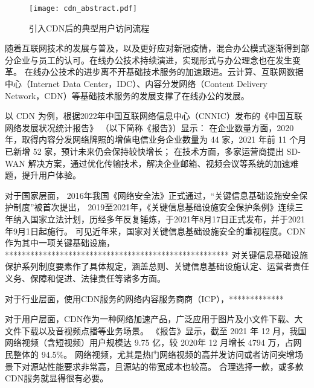 \begin{figure}[h]
	\centering
	\texttt{[image: cdn\_abstract.pdf]}
	\caption{引入CDN后的典型用户访问流程}
	\label{fig:join_cdn_classic}
\end{figure}





随着互联网技术的发展与普及，以及更好应对新冠疫情，混合办公模式逐渐得到部分企业与员工的认可。在线办公技术持续演进，实现形式与办公理念也在发生变革。
在线办公技术的进步离不开基础技术服务的加速跟进。云计算、互联网数据中心（Internet Data Center，IDC）、内容分发网络（Content Delivery Network，CDN）等基础技术服务的发展支撑了在线办公的发展。

以 CDN 为例，根据2022年中国互联网络信息中心（CNNIC）发布的《中国互联网络发展状况统计报告》\cite{cnnic2022} （以下简称《报告》）显示：
在企业数量方面，2020 年，取得内容分发网络牌照的增值电信业务企业数量为 44 家，2021 年前 11 个月已新增 52 家，预计未来仍会保持较快增长；
在技术方面，多家运营商提出 SD-WAN 解决方案，通过优化传输技术，解决企业邮箱、视频会议等系统的加速难题，提升用户体验。


对于国家层面，
2016年我国《网络安全法》正式通过，“关键信息基础设施安全保护制度”被首次提出，
2019至2021年，《关键信息基础设施安全保护条例》连续三年纳入国家立法计划，历经多年反复锤炼，于2021年8月17日正式发布，并于2021年9月1日起施行。
可见近年来，国家对关键信息基础设施安全的重视程度。CDN作为其中一项关键基础设施，*****************************************************
对关键信息基础设施保护系列制度要素作了具体规定，涵盖总则、关键信息基础设施认定、运营者责任义务、保障和促进、法律责任等诸多方面。



对于行业层面，使用CDN服务的网络内容服务商商（ICP），*************


对于用户层面，CDN作为一种网络加速产品，广泛应用于图片及小文件下载、大文件下载以及音视频点播等业务场景。
《报告》显示，截至 2021 年 12 月，我国网络视频（含短视频）用户规模达 9.75 亿，较 2020年 12 月增长 4794 万，占网民整体的 94.5\%。
网络视频，尤其是热门网络视频的高并发访问或者访问突增场景下对源站性能要求非常高，且源站的带宽成本也较高。
合理选择一款，或多款CDN服务就显得很有必要。

